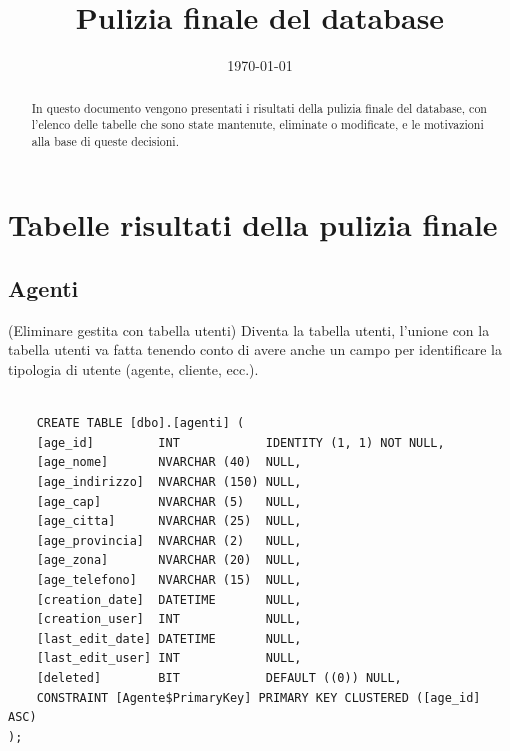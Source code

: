 \documentclass[12pt]{article}
\title{Pulizia finale del database}
\author{}
\date{\today}
\begin{document}
\maketitle

\begin{abstract}
    In questo documento vengono presentati i risultati della pulizia finale del database,
    con l'elenco delle tabelle che sono state mantenute, eliminate o modificate, e le motivazioni alla base di queste decisioni.
\end{abstract}
\section{Tabelle risultati della pulizia finale}

\subsection{Agenti}(Eliminare gestita con tabella utenti)
Diventa la tabella utenti, l'unione con la tabella utenti va fatta tenendo conto di avere anche un campo per identificare la tipologia di utente (agente, cliente, ecc.).
\begin{lstlisting}

    CREATE TABLE [dbo].[agenti] (
    [age_id]         INT            IDENTITY (1, 1) NOT NULL,
    [age_nome]       NVARCHAR (40)  NULL,
    [age_indirizzo]  NVARCHAR (150) NULL,
    [age_cap]        NVARCHAR (5)   NULL,
    [age_citta]      NVARCHAR (25)  NULL,
    [age_provincia]  NVARCHAR (2)   NULL,
    [age_zona]       NVARCHAR (20)  NULL,
    [age_telefono]   NVARCHAR (15)  NULL,
    [creation_date]  DATETIME       NULL,
    [creation_user]  INT            NULL,
    [last_edit_date] DATETIME       NULL,
    [last_edit_user] INT            NULL,
    [deleted]        BIT            DEFAULT ((0)) NULL,
    CONSTRAINT [Agente$PrimaryKey] PRIMARY KEY CLUSTERED ([age_id] ASC)
); 
\end{lstlisting}
\end{document}

